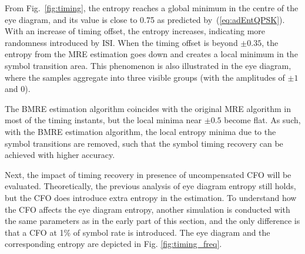 \documentclass[journal,comsoc]{IEEEtran}
\begin{document}
From Fig.~\ref{fig:timing}, the entropy reaches a global minimum in the centre of the eye diagram, and its value is close to 0.75 as predicted by~(\ref{eq:adEntQPSK}).
With an increase of timing offset, the entropy increases, indicating  more randomness introduced by ISI.
When the timing offset is beyond $\pm 0.35$, the  entropy from the MRE estimation goes down and creates a local minimum in the symbol transition area. 
This phenomenon is also illustrated in the eye diagram, where the samples aggregate into three visible groups (with the amplitudes of \(\pm 1\) and 0).

The BMRE estimation algorithm coincides with the original MRE algorithm in most of the timing instants, but the local minima near $\pm0.5$ become flat.
As such, with the BMRE estimation algorithm, the local entropy minima due to the symbol transitions are removed, such that the symbol timing recovery can be achieved with higher accuracy.

Next, the impact of timing recovery in presence of uncompensated CFO will be evaluated.  
Theoretically, the previous analysis of eye diagram entropy still holds, but the CFO does introduce extra entropy in the estimation.
To understand how the CFO affects the eye diagram entropy, another simulation is conducted with the same parameters as in the early part of this section,
and the only difference is that a CFO at 1\% of symbol rate is introduced.
The eye diagram and the corresponding entropy are depicted in Fig. \ref{fig:timing_freq}.
      
\end{document}

